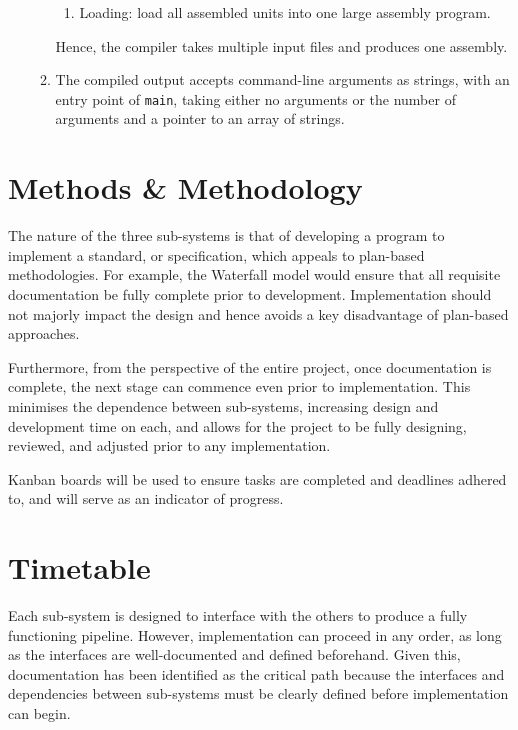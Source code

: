 \documentclass{article}
\begin{document}
\begin{enumerate}
\begin{enumerate}
\begin{enumerate}
                \item Loading: load all assembled units into one large assembly program.
            \end{enumerate}
            Hence, the compiler takes multiple input files and produces one assembly.
            \item The compiled output accepts command-line arguments as strings, with an entry point of \texttt{main}, taking either no arguments or the number of arguments and a pointer to an array of strings.
        \end{enumerate}
    \end{enumerate}

    \section{Methods \& Methodology}\label{sec:methods-&-methodology}

    The nature of the three sub-systems is that of developing a program to implement a standard, or specification, which appeals to plan-based methodologies.
    For example, the Waterfall model would ensure that all requisite documentation be fully complete prior to development.
    Implementation should not majorly impact the design and hence avoids a key disadvantage of plan-based approaches.

    Furthermore, from the perspective of the entire project, once documentation is complete, the next stage can commence even prior to implementation.
    This minimises the dependence between sub-systems, increasing design and development time on each, and allows for the project to be fully designing, reviewed, and adjusted prior to any implementation.

    Kanban boards will be used to ensure tasks are completed and deadlines adhered to, and will serve as an indicator of progress.

    \section{Timetable}\label{sec:timetable}

    Each sub-system is designed to interface with the others to produce a fully functioning pipeline.
    However, implementation can proceed in any order, as long as the interfaces are well-documented and defined beforehand.
    Given this, documentation has been identified as the critical path because the interfaces and dependencies between sub-systems must be clearly defined before implementation can begin.
\end{document}
